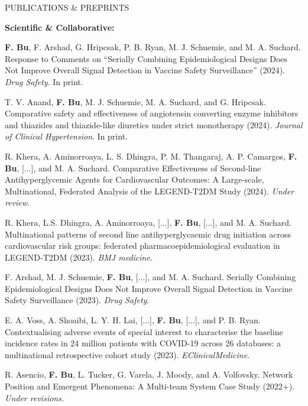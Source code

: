 \documentclass{resume} %
\begin{document}
\begin{rSection}{PUBLICATIONS \& PREPRINTS}
\medskip

\hspace{-.2in} \textbf{Scientific \& Collaborative:}

\textbf{F. Bu}, F. Arshad, G. Hripcsak, P. B. Ryan, M. J. Schuemie, and M. A. Suchard. Response to Comments on ``Serially Combining Epidemiological Designs Does Not Improve Overall Signal Detection in Vaccine Safety Surveillance'' (2024). \emph{Drug Safety}. In print. 

\smallskip 

T. V. Anand, \textbf{F. Bu}, M. J. Schuemie, M. A. Suchard, and G. Hripcsak. Comparative safety and effectiveness of angiotensin converting enzyme inhibitors and thiazides and thiazide-like diuretics under strict monotherapy (2024).  \emph{Journal of Clinical Hypertension}. In print. 

\smallskip 

R. Khera, A. Aminorroaya, L. S. Dhingra, P. M.  Thangaraj, A. P. Camargos, \textbf{F. Bu}, [...], and M. A. Suchard. Comparative Effectiveness of Second-line Antihyperglycemic Agents for Cardiovascular Outcomes: A Large-scale, Multinational, Federated Analysis of the LEGEND-T2DM Study (2024). \emph{Under review}. 

\smallskip 

R. Khera, L.S. Dhingra, A. Aminorroaya, [...], \textbf{F. Bu}, [...], and  M. A. Suchard.  Multinational patterns of second line antihyperglycaemic drug initiation across cardiovascular risk groups: federated pharmacoepidemiological evaluation in LEGEND-T2DM (2023). \emph{BMJ medicine}. 

\smallskip

F. Arshad, M. J. Schuemie, \textbf{F. Bu}, [...], and M. A. Suchard. Serially Combining Epidemiological Designs Does Not Improve Overall Signal Detection in Vaccine Safety Surveillance (2023). \emph{Drug Safety}. 

\smallskip

E. A. Voss, A. Shoaibi, L. Y. H. Lai,  [...], \textbf{F. Bu}, [...], and P. B. Ryan. Contextualising adverse events of special interest to characterise the baseline incidence rates in 24 million patients with COVID-19 across 26 databases: a multinational retrospective cohort study (2023). \emph{EClinicalMedicine}. 


\smallskip

R. Asencio, \textbf{F. Bu}, L. Tucker, G. Varela, J. Moody, and A. Volfovsky. 
Network Position and Emergent Phenomena: A Multi-team System Case Study (2022+). \emph{Under revisions.}




\end{rSection}
\end{document}
